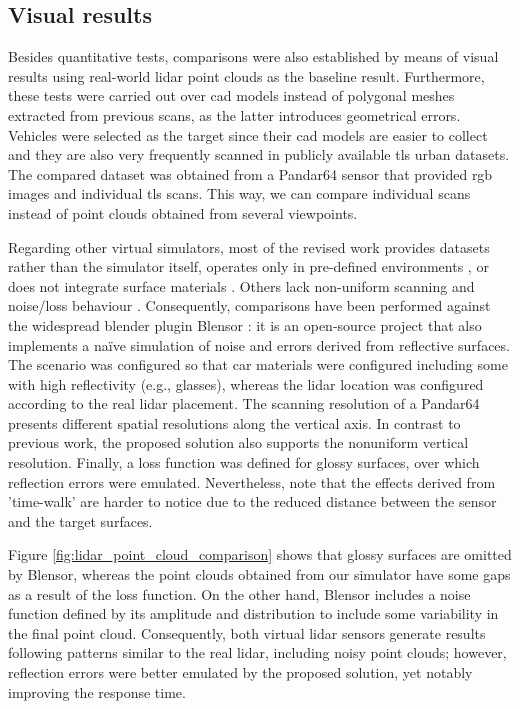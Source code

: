 \subsection{Visual results}

Besides quantitative tests, comparisons were also established by means of visual results using real-world \acrshort{lidar} point clouds as the baseline result. Furthermore, these tests were carried out over \acrshort{cad} models instead of polygonal meshes extracted from previous scans, as the latter introduces geometrical errors. Vehicles were selected as the target since their \acrshort{cad} models are easier to collect and they are also very frequently scanned in publicly available \acrshort{tls} urban datasets. The compared dataset was obtained from a Pandar64 sensor \cite{hesai_pandaset_2021} that provided \acrshort{rgb} images and individual \acrshort{tls} scans. This way, we can compare individual scans instead of point clouds obtained from several viewpoints. 

Regarding other virtual simulators, most of the revised work provides datasets rather than the simulator itself, operates only in pre-defined environments \cite{lg_electronics_rd_lab_lgsvl_2021}, or does not integrate surface materials \cite{yue_lidar_2018, xiao_synlidar_2021, manivasagam_lidarsim_2020, fang_augmented_2020, su_simulation_2019}. Others lack non-uniform scanning \cite{dosovitskiy_carla_2017} and noise/loss behaviour \cite{shah_airsim_2017}. Consequently, comparisons have been performed against the widespread blender plugin Blensor \cite{gschwandtner_blensor_2011}: it is an open-source project that also implements a naïve simulation of noise and errors derived from reflective surfaces. The scenario was configured so that car materials were configured including some with high reflectivity (e.g., glasses), whereas the \acrshort{lidar} location was configured according to the real \acrshort{lidar} placement. The scanning resolution of a Pandar64 presents different spatial resolutions along the vertical axis. In contrast to previous work, the proposed solution also supports the nonuniform vertical resolution. Finally, a loss function was defined for glossy surfaces, over which reflection errors were emulated. Nevertheless, note that the effects derived from 'time-walk' are harder to notice due to the reduced distance between the sensor and the target surfaces. 

Figure \ref{fig:lidar_point_cloud_comparison} shows that glossy surfaces are omitted by Blensor, whereas the point clouds obtained from our simulator have some gaps as a result of the loss function. On the other hand, Blensor includes a noise function defined by its amplitude and distribution to include some variability in the final point cloud. Consequently, both virtual \acrshort{lidar} sensors generate results following patterns similar to the real \acrshort{lidar}, including noisy point clouds; however, reflection errors were better emulated by the proposed solution, yet notably improving the response time.

